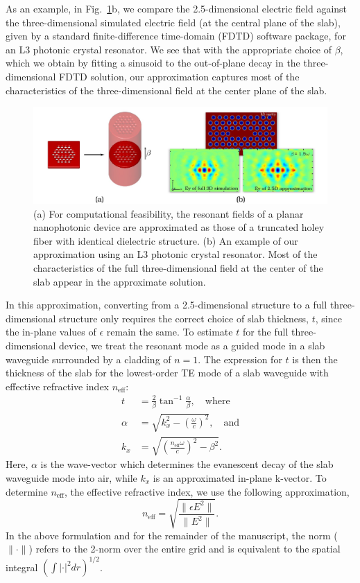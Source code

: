 As an example, in Fig.~\ref{approx}b, we compare the 2.5-dimensional electric field against the three-dimensional simulated electric field (at the central plane of the slab), given by a standard finite-difference time-domain (FDTD) software package, for an L3 photonic crystal resonator. We see that with the appropriate choice of $\beta$, which we obtain by fitting a sinusoid to the out-of-plane decay in the three-dimensional FDTD solution, our approximation captures most of the characteristics of the three-dimensional field at the center plane of the slab. 
\begin{figure}[hbt]
\centering\includegraphics[width=\textwidth]{p2/approx}
\caption{(a) For computational feasibility, the resonant fields of a planar nanophotonic device are approximated as those of a truncated holey fiber with identical dielectric structure. (b) An example of our approximation using an L3 photonic crystal resonator. Most of the characteristics of the full three-dimensional field at the center of the slab appear in the approximate solution.}\label{approx}
\end{figure}

In this approximation, converting from a 2.5-dimensional structure to a full three-dimensional structure only requires the correct choice of slab thickness, $t$, since the in-plane values of $\epsilon$ remain the same. To estimate $t$ for the full three-dimensional device, we treat the resonant mode as a guided mode in a slab waveguide surrounded by a cladding of $n=1$. The expression for $t$ is then the thickness of the slab for the lowest-order TE mode of a slab waveguide with effective refractive index $n_\text{eff}$\cite{inan}:
\begin{align}
t &= \frac{2}{\beta}\tan^{-1}\frac{\alpha}{\beta},\label{t} \quad\text{where} \\
\alpha &= \sqrt{k_x^2 - \left(\frac{\omega}{c}\right)^2}, \quad\text{and} \\
k_x &= \sqrt{\left(\frac{n_\text{eff}\omega}{c}\right)^2 - \beta^2}.
\end{align}
Here, $\alpha$ is the wave-vector which determines the evanescent decay of the slab waveguide mode into air, while $k_x$ is an approximated in-plane k-vector. To determine $n_\text{eff}$, the effective refractive index, we use the following approximation,
\begin{equation}
n_\text{eff} = \sqrt{\frac{\|\epsilon E^2\|}{\|E^2\|}}.
\end{equation}
In the above formulation and for the remainder of the manuscript, the norm ($\|\cdot\|$) refers to the 2-norm over the entire grid and is equivalent to the spatial integral $(\int | \cdot |^2 dr)^{1/2}$.




